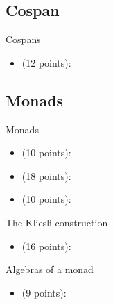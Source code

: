 \subsection{Cospan}

Cospans
\begin{itemize}
    \item {} (12 points): 
\end{itemize}

\subsection{Monads}

Monads
\begin{itemize}
    \item {} (10 points): 
    \item {} (18 points): 
    \item {} (10 points): 
\end{itemize}
The Kliesli construction
\begin{itemize}
    \item {} (16 points): 
\end{itemize}
Algebras of a monad
\begin{itemize}
    \item {} (9 points): 
\end{itemize}